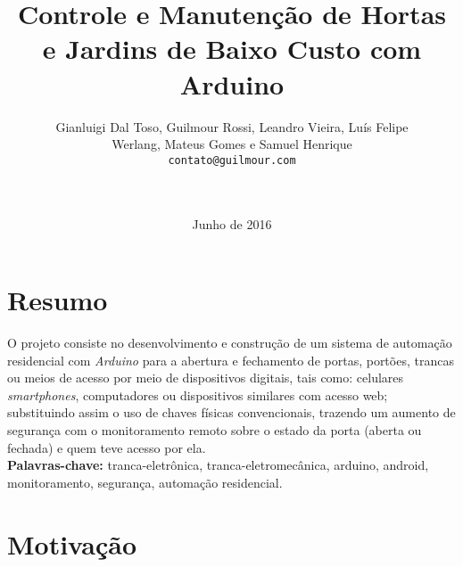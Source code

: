\documentclass[draft]{article}
\begin{document}
\title{Controle e Manutenção de Hortas e Jardins de Baixo Custo com Arduino}
\author{Gianluigi Dal Toso, Guilmour Rossi, Leandro Vieira, Luís Felipe\\Werlang, Mateus Gomes e Samuel Henrique\\\texttt{contato@guilmour.com}\\\\\\
}

\date{Junho de 2016}

\maketitle

\newpage

\tableofcontents

\newpage

\section{Resumo}
  O projeto consiste no desenvolvimento e construção de um sistema de automação residencial com \textit{Arduino} para a abertura e fechamento de portas, portões, trancas ou meios de acesso por meio de dispositivos digitais, tais como: celulares \textit{smartphones}, computadores ou dispositivos similares com acesso web; substituindo assim o uso de chaves físicas convencionais, trazendo um aumento de segurança com o monitoramento remoto sobre o estado da porta (aberta ou fechada) e quem teve acesso por ela.
  \textbf{\\Palavras-chave:} tranca-eletrônica, tranca-eletromecânica, arduino, android, monitoramento, segurança, automação residencial.

\newpage

\section{Motivação}
\end{document}
